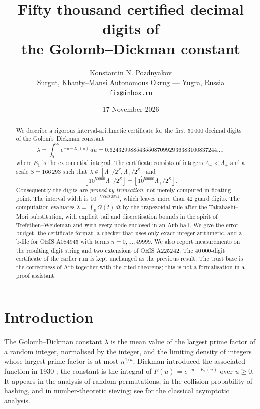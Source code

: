 \documentclass[11pt,a4paper]{article}
\title{Fifty thousand certified decimal digits of\\ the Golomb--Dickman constant}
\author{Konstantin N. Pozdnyakov\\
\small Surgut, Khanty--Mansi Autonomous Okrug --- Yugra, Russia\\
\small \texttt{fix@inbox.ru}}
\date{17 November 2026}
\theoremstyle{remark}
\newcommand{\Eone}{E_1}
\newcommand{\lam}{\lambda}
\newcommand{\R}{\mathbb{R}}
\newcommand{\floor}[1]{\left\lfloor #1 \right\rfloor}
\begin{document}
\maketitle

\begin{abstract}
We describe a rigorous interval-arithmetic certificate for the first
50\,000 decimal digits of the Golomb--Dickman constant
\[
  \lam=\int_0^\infty e^{-u-\Eone(u)}\,du
      =0.624329988543550870992936383100837244\ldots,
\]
where $\Eone$ is the exponential integral. The certificate consists of
integers $\Lambda_-<\Lambda_+$ and a scale $S=166\,293$ such that
$\lam\in[\Lambda_-/2^S,\Lambda_+/2^S]$ and
\[
  \floor{10^{50000}\Lambda_-/2^S}
  =\floor{10^{50000}\Lambda_+/2^S}.
\]
Consequently the digits are \emph{proved by truncation}, not merely
computed in floating point. The interval width is
$10^{-50042.3574}$, which leaves more than $42$ guard digits. The
computation evaluates
$\lam=\int_{\R}G(t)\,dt$ by the trapezoidal rule after the
Takahashi--Mori substitution, with explicit tail and discretisation
bounds in the spirit of Trefethen--Weideman and with every node enclosed
in an Arb ball. We give the error budget, the certificate format, a
checker that uses only exact integer arithmetic, and a b-file for OEIS
A084945 with terms $n=0,\ldots,49999$. We also report measurements on the
resulting digit string and two extensions of OEIS A225242. The
40\,000-digit certificate of the earlier run is kept unchanged as the
previous result. The trust base
is the correctness of Arb together with the cited theorems; this is not a
formalisation in a proof assistant.
\end{abstract}

\tableofcontents

\section{Introduction}

The Golomb--Dickman constant $\lam$ is the mean value of the largest
prime factor of a random integer, normalised by the integer, and the
limiting density of integers whose largest prime factor is at most
$n^{1/u}$. Dickman introduced the associated function in 1930
\cite{dickman1930}; the constant is the integral of
$F(u)=e^{-u-\Eone(u)}$ over $u\ge0$. It appears in the analysis of
random permutations, in the collision probability of hashing, and in
number-theoretic sieving; see \cite{debruijn1951} for the classical
asymptotic analysis.
\end{document}
